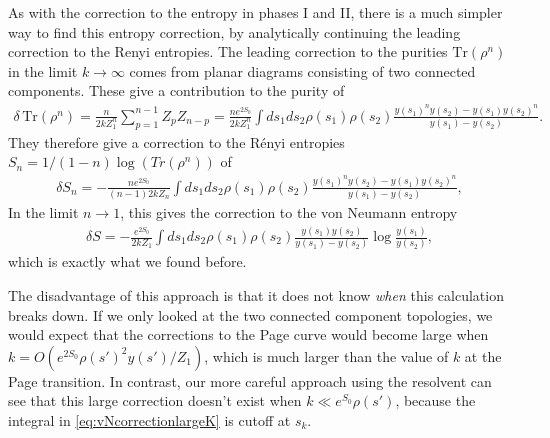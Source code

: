 \documentclass[11pt]{article}
\newcommand{\smax}{s_k}
\newcommand{\sprime}{s'}
\numberwithin{equation}{section}
\def\Tr{\text{Tr}}
\begin{document}
As with the correction to the entropy in phases I and II, there is a much simpler way to find this entropy correction, by analytically continuing the leading correction to the Renyi entropies. The leading correction to the purities $\Tr(\rho^n)$ in the limit $k\to \infty$ comes from planar diagrams consisting of two connected components. These give a contribution to the purity of
\begin{align}
\delta \,\Tr(\rho^n) = \frac{n}{2 k Z_1^n} \sum_{p=1}^{n-1} Z_p Z_{n-p} =  \frac{n e^{2S_0}}{2 k Z_1^n} \int ds_1 ds_2 \rho(s_1) \rho(s_2) \frac{y(s_1)^n y(s_2) - y(s_1) y(s_2)^n}{y(s_1) - y(s_2)}.
\end{align}
They therefore give a correction to the R\'{e}nyi entropies $S_n = 1/(1-n) \log(Tr(\rho^n))$ of
\begin{align}
\delta S_n = - \frac{n  e^{2S_0}}{(n-1) 2 k Z_n}  \int ds_1 ds_2 \rho(s_1) \rho(s_2) \frac{y(s_1)^n y(s_2) - y(s_1) y(s_2)^n}{y(s_1) - y(s_2)},
\end{align}
In the limit $n \to 1$, this gives the correction to the von Neumann entropy
\begin{align}
\delta S = - \frac{ e^{2S_0}}{2 k Z_1}  \int ds_1 ds_2 \rho(s_1) \rho(s_2) \frac{y(s_1)y(s_2)}{y(s_1) - y(s_2)} \log \frac{y(s_1)}{y(s_2)},
\end{align}
which is exactly what we found before.

The disadvantage of this approach is that it does not know \emph{when} this calculation breaks down. If we only looked at the two connected component topologies, we would expect that the corrections to the Page curve would become large when $k =  O(e^{2S_0} \rho(\sprime)^2 y(\sprime)/Z_1)$, which is much larger than the value of $k$ at the Page transition. In contrast, our more careful approach using the resolvent can see that this large correction doesn't exist when $k \ll e^{S_0} \rho(\sprime)$, because the integral in \eqref{eq:vNcorrectionlargeK} is cutoff at $\smax$.
\end{document}
